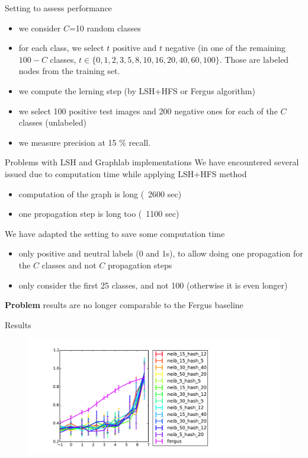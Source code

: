 \documentclass[11pt)]{beamer}
\begin{document}
\begin{frame}{Setting to assess performance}
\begin{itemize}
\item we consider $C$=10 random classes
\item for each class, we select $t$ positive and $t$ negative (in one of the remaining $100-C$ classes, $t\in \{0, 1, 2, 3, 5, 8, 10, 16, 20, 40, 60, 100\}$. Those are labeled nodes from the training set.
\item we compute the lerning step (by LSH+HFS or Fergus algorithm)
\item we select 100 positive test images and 200 negative ones for each of the $C$ classes (unlabeled)
\item we measure precision at 15 \% recall.
\end{itemize}
\end{frame}

\begin{frame}{Problems with LSH and Graphlab implementations}
We have encountered several issued due to computation time while applying LSH+HFS method
\begin{itemize}
\item computation of the graph is long (~2600 sec)
\item one propagation step is long too (~1100 sec)
\end{itemize}
We have adapted the setting to save some computation time
\begin{itemize}
\item only positive and neutral labels (0 and 1s), to allow doing one propagation for the $C$ classes and not $C$ propagation steps
\item only consider the first 25 classes, and not 100 (otherwise it is even longer)
\end{itemize}

{\color{red}\textbf{Problem} results are no longer comparable to the Fergus baseline}

\end{frame}

\begin{frame}{Results}
\begin{figure}
  \includegraphics[width=\textwidth]{method_comp.pdf}
\end{figure}
\end{frame}
\end{document}
